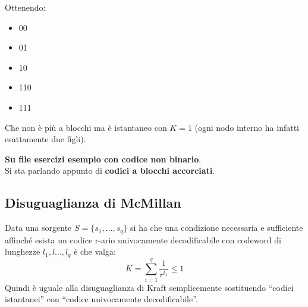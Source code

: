 \documentclass[a4paper,12pt, oneside]{book}
\begin{document}
\begin{esempio}
\begin{figure}[H]
  \end{figure}
  Ottenendo:
  \begin{itemize}
    \item 00
    \item 01
    \item 10
    \item 110
    \item 111
  \end{itemize}
  Che non è più a blocchi ma è istantaneo con $K=1$ (ogni nodo interno ha
  infatti esattamente due figli).
\end{esempio}
\textbf{Su file esercizi esempio con codice non binario}.\\
Si sta parlando appunto di \textbf{codici a blocchi accorciati}.
\subsection{Disuguaglianza di McMillan}
\begin{teorema}
  Data una sorgente $S=\{s_1,\ldots,s_q\}$ si ha che una condizione necessaria e
  sufficiente affinché esista un codice r-ario univocamente decodificabile con
  codeword di lunghezze $l_1,l\dots,l_q$ è che valga:
  \[K=\sum_{i=1}^q\frac{1}{r^{l_1}}\leq 1\]
  \textup{Quindi è uguale alla disuguaglianza di Kraft semplicemente sostituendo
  ``codici istantanei'' con ``codice univocamente decodificabile''.}
\end{teorema}
\end{document}
